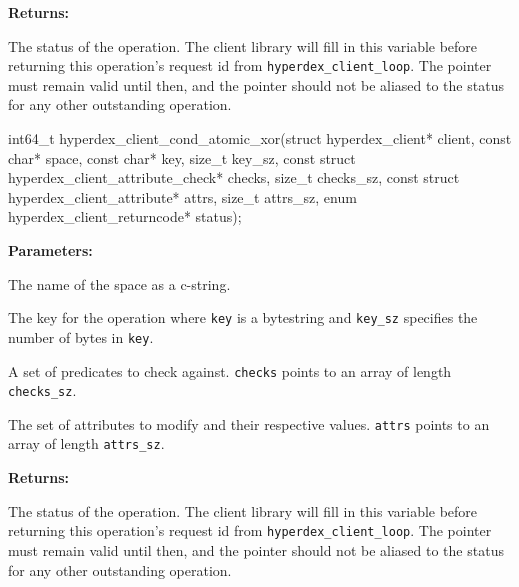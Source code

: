 \noindent\textbf{Returns:}
\begin{description}[labelindent=\widthof{{\texttt{status}}},leftmargin=*,noitemsep,nolistsep,align=right]
\item[\texttt{status}] The status of the operation.  The client library will fill in this variable before returning this operation's request id from \texttt{hyperdex\_client\_loop}.  The pointer must remain valid until then, and the pointer should not be aliased to the status for any other outstanding operation.
\end{description}

\funcsep
{}
\begin{ccode}
int64_t hyperdex_client_cond_atomic_xor(struct hyperdex_client* client,
                const char* space,
                const char* key, size_t key_sz,
                const struct hyperdex_client_attribute_check* checks, size_t checks_sz,
                const struct hyperdex_client_attribute* attrs, size_t attrs_sz,
                enum hyperdex_client_returncode* status);
\end{ccode}
\funcdesc 

\noindent\textbf{Parameters:}
\begin{description}[labelindent=\widthof{{\texttt{checks}, \texttt{checks\_sz}}},leftmargin=*,noitemsep,nolistsep,align=right]
\item[\texttt{space}] The name of the space as a c-string.
\item[\texttt{key}, \texttt{key\_sz}] The key for the operation where \texttt{key} is a bytestring and \texttt{key\_sz} specifies the number of bytes in \texttt{key}.
\item[\texttt{checks}, \texttt{checks\_sz}] A set of predicates to check against.  \texttt{checks} points to an array of length \texttt{checks\_sz}.
\item[\texttt{attrs}, \texttt{attrs\_sz}] The set of attributes to modify and their respective values.  \texttt{attrs} points to an array of length \texttt{attrs\_sz}.
\end{description}

\noindent\textbf{Returns:}
\begin{description}[labelindent=\widthof{{\texttt{status}}},leftmargin=*,noitemsep,nolistsep,align=right]
\item[\texttt{status}] The status of the operation.  The client library will fill in this variable before returning this operation's request id from \texttt{hyperdex\_client\_loop}.  The pointer must remain valid until then, and the pointer should not be aliased to the status for any other outstanding operation.
\end{description}


